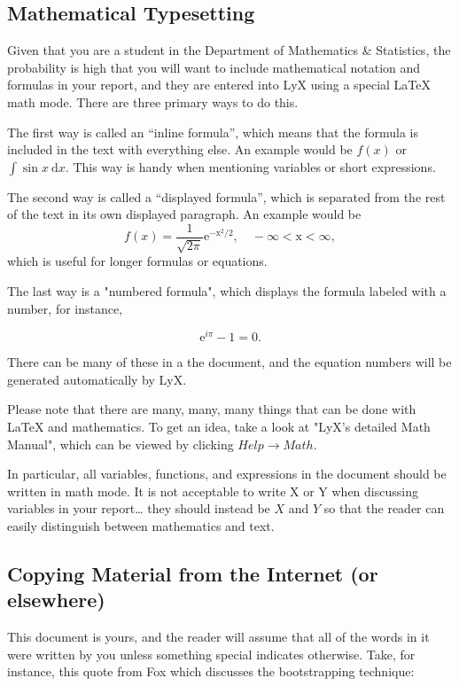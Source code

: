 \documentclass[11pt]{article}
\begin{document}
\subsection[Mathematical Typesetting]{Mathematical Typesetting}
\label{sec-3-1}

Given that you are a student in the Department of Mathematics \&
Statistics, the probability is high that you will want to include
mathematical notation and formulas in your report, and they are
entered into LyX using a special \LaTeX{} math mode. There are three
primary ways to do this.

The first way is called an “inline formula”, which means that the
formula is included in the text with everything else. An example would
be \(f(x)\) or \( \int\sin x\ \mathrm{d}x \). This way is handy when
mentioning variables or short expressions.

The second way is called a “displayed formula”, which is separated
from the rest of the text in its own displayed paragraph. An example
would be
\[
f(x)=\frac{1}{\sqrt{2\pi}}\mathrm{e^{-x^{2}/2},\quad-\infty<x<\infty},
\]
which is useful for longer formulas or equations. 

The last way is a "numbered formula", which displays the formula
labeled with a number, for instance,

\begin{equation}
\mathrm{e}^{i\pi}-1=0.
\end{equation}

There can be many of these in a the document, and the equation numbers
will be generated automatically by LyX.

Please note that there are many, many, many things that can be 
done with \LaTeX{} and mathematics. To get an idea, take a look at "LyX's detailed Math Manual", which can be viewed by clicking \(Help \rightarrow Math\). 

In particular, all variables, functions, and expressions in the
document should be written in math mode. It is not acceptable to write
X or Y when discussing variables in your report\ldots{} they should instead
be \(X\) and \(Y\) so that the reader can easily distinguish between
mathematics and text.
\subsection[Copying Material from the Internet (or elsewhere)]{Copying Material from the Internet (or elsewhere)}
\label{sec-3-2}

This document is yours, and the reader will assume that all of the
words in it were written by you unless something special indicates
otherwise. Take, for instance, this quote from Fox \cite{Fox2002}
which discusses the bootstrapping technique:
\end{document}
